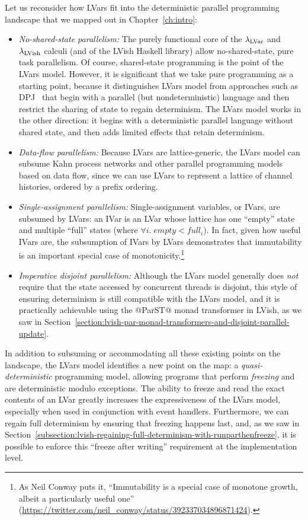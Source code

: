 Let us reconsider how LVars fit into the deterministic parallel
programming landscape that we mapped out in Chapter~\ref{ch:intro}:
\begin{itemize}
  \item \emph{No-shared-state parallelism:} The purely functional core
    of the $\lambda_{\textrm{LVar}}$ and $\lambda_{\textrm{LVish}}$ calculi (and of the LVish
    Haskell library) allow no-shared-state, pure task parallelism.  Of
    course, shared-state programming is the point of the LVars model.
    However, it is significant that we take pure programming as a
    starting point, because it distinguishes LVars model from
    approaches such as DPJ~\cite{dpj-oopsla} that begin with a
    parallel (but nondeterministic) language and then restrict the
    sharing of state to regain determinism.  The LVars model works in
    the other direction: it begins with a deterministic parallel
    language without shared state, and then adds limited effects that
    retain determinism.
  \item \emph{Data-flow parallelism:} Because LVars are
    lattice-generic, the LVars model can subsume Kahn process networks
    and other parallel programming models based on data flow, since we
    can use LVars to represent a lattice of channel histories, ordered
    by a prefix ordering.
  \item \emph{Single-assignment parallelism:} Single-assignment
    variables, or IVars, are subsumed by LVars: an IVar is an LVar
    whose lattice has one ``empty'' state and multiple ``full'' states
    (where $\forall{i}.\; \mathit{empty} < \mathit{full_i}$).  In
    fact, given how useful IVars are, the subsumption of IVars by
    LVars demonstrates that immutability is an important special case
    of monotonicity.\footnote{As Neil Conway puts it, ``Immutability
      is a special case of monotone growth, albeit a particularly
      useful one''
      (\url{https://twitter.com/neil_conway/status/392337034896871424}).}
  \item \emph{Imperative disjoint parallelism:} Although the LVars
    model generally does \emph{not} require that the state accessed by
    concurrent threads is disjoint, this style of ensuring determinism
    is still compatible with the LVars model, and it is practically
    achievable using the @ParST@ monad transformer in LVish, as we saw
    in
    Section~\ref{section:lvish-par-monad-transformers-and-disjoint-parallel-update}.
\end{itemize}
In addition to subsuming or accommodating all these existing points on
the landscape, the LVars model identifies a new point on the map: a
\emph{quasi-deterministic} programming model, allowing programs that
perform \emph{freezing} and are deterministic modulo exceptions.  The
ability to freeze and read the exact contents of an LVar greatly
increases the expressiveness of the LVars model, especially when used
in conjunction with event handlers.  Furthermore, we can regain full
determinism by ensuring that freezing happens last, and, as we saw in
Section~\ref{subsection:lvish-regaining-full-determinism-with-runparthenfreeze},
it is possible to enforce this ``freeze after writing'' requirement at
the implementation level.

